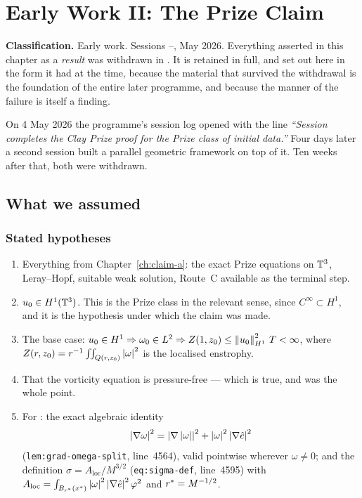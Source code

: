 \chapter{Early Work II: The Prize Claim}
\label{ch:prize-claim}

\begin{record}
\textbf{Classification.} Early work. Sessions --, May 2026.
Everything asserted in this chapter as a \emph{result} was withdrawn in
. It is retained in full, and set out here in the form it had at the
time, because the material that survived the withdrawal is the foundation of
the entire later programme, and because the manner of the failure is itself a
finding.
\end{record}

On 4 May 2026 the programme's session log opened with the line
\emph{``Session  completes the Clay Prize proof for the Prize class of
initial data.''} Four days later a second session built a parallel geometric
framework on top of it. Ten weeks after that, both were withdrawn.

\section{What we assumed}
\label{sec:prize-assumed}

\subsection{Stated hypotheses}

\begin{enumerate}[leftmargin=2.2em]
\item Everything from Chapter~\ref{ch:claim-a}: the exact Prize equations on
  \(\mathbb{T}^3\), Leray--Hopf, suitable weak solution, Route~C available as the
  terminal step.
\item \(u_0\in H^1(\mathbb{T}^3)\). This is the Prize class in the relevant sense,
  since \(C^\infty\subset H^1\), and it is the hypothesis under which the
  claim was made.
\item The base case: \(u_0\in H^1\Rightarrow\omega_0\in L^2\Rightarrow
  Z(1,z_0)\le\left\|u_0\right\|_{H^1}^2\,T<\infty\), where
  \(Z(r,z_0)=r^{-1}\iint_{Q(r,z_0)}\left|\omega\right|^2\) is the localised
  enstrophy.
\item That the vorticity equation is pressure-free --- which is true, and was
  the whole point.
\item For : the exact algebraic identity
  \[
    \left|\nabla\omega\right|^2=\left|\nabla\left|\omega\right|\right|^2
      +\left|\omega\right|^2\left|\nabla\hat{e}\right|^2
  \]
  (\texttt{lem:grad-omega-split}, line~4564), valid
  pointwise wherever \(\omega\neq0\); and the definition
  \(\sigma=A_{\mathrm{loc}}/M^{3/2}\) (\texttt{eq:sigma-def}, line~4595) with
  \(A_{\mathrm{loc}}=\int_{B_{r^{*}}(x^*)}\left|\omega\right|^2\left|\nabla\hat{e}\right|^2
  \varphi^2\) and \(r^{*}=M^{-1/2}\).
\end{enumerate}

